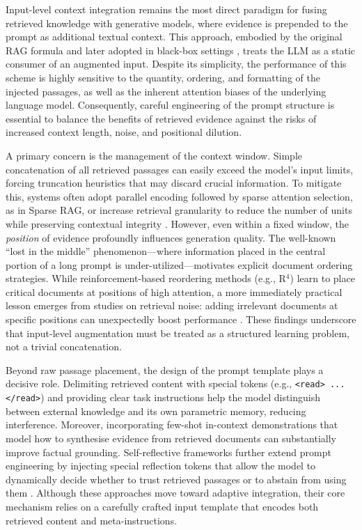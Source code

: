 \documentclass[11pt,a4paper]{article}
\begin{document}
Input-level context integration remains the most direct paradigm for fusing retrieved knowledge with generative models, where evidence is prepended to the prompt as additional textual context. This approach, embodied by the original RAG formula \cite{arxiv:2005.11401v4} and later adopted in black-box settings \cite{arxiv:2301.12652v4}, treats the LLM as a static consumer of an augmented input. Despite its simplicity, the performance of this scheme is highly sensitive to the quantity, ordering, and formatting of the injected passages, as well as the inherent attention biases of the underlying language model. Consequently, careful engineering of the prompt structure is essential to balance the benefits of retrieved evidence against the risks of increased context length, noise, and positional dilution.

A primary concern is the management of the context window. Simple concatenation of all retrieved passages can easily exceed the model's input limits, forcing truncation heuristics that may discard crucial information. To mitigate this, systems often adopt parallel encoding followed by sparse attention selection, as in Sparse RAG, or increase retrieval granularity to reduce the number of units while preserving contextual integrity \cite{arxiv:2406.15319v3}. However, even within a fixed window, the \emph{position} of evidence profoundly influences generation quality. The well-known ``lost in the middle'' phenomenon---where information placed in the central portion of a long prompt is under-utilized---motivates explicit document ordering strategies. While reinforcement-based reordering methods (e.g., R$^{4}$) learn to place critical documents at positions of high attention, a more immediately practical lesson emerges from studies on retrieval noise: adding irrelevant documents at specific positions can unexpectedly boost performance \cite{arxiv:2401.14887v3}. These findings underscore that input-level augmentation must be treated as a structured learning problem, not a trivial concatenation.

Beyond raw passage placement, the design of the prompt template plays a decisive role. Delimiting retrieved content with special tokens (e.g., \texttt{<read> ... </read>}) and providing clear task instructions help the model distinguish between external knowledge and its own parametric memory, reducing interference. Moreover, incorporating few-shot in-context demonstrations that model how to synthesise evidence from retrieved documents can substantially improve factual grounding. Self-reflective frameworks further extend prompt engineering by injecting special reflection tokens that allow the model to dynamically decide whether to trust retrieved passages or to abstain from using them \cite{arxiv:2310.11511v1}. Although these approaches move toward adaptive integration, their core mechanism relies on a carefully crafted input template that encodes both retrieved content and meta-instructions.
\end{document}
